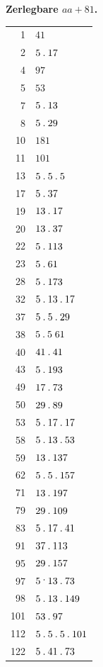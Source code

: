 %
\par{}
\begin{center}\textbf{Zerlegbare $aa+81$.}\end{center}
\begingroup\small\setlength{\tabcolsep}{5pt}
\begin{longtable}{@{}r|l@{}}
1 & $41$\\
2 & $5\mathbin{.} 17$\\
4 & $97$\\
5 & $53$\\
7 & $5\mathbin{.} 13$\\
8 & $5\mathbin{.} 29$\\
10 & $181$\\
11 & $101$\\
13 & $5\mathbin{.} 5\mathbin{.} 5$\\
17 & $5\mathbin{.} 37$\\
19 & $13\mathbin{.} 17$\\
20 & $13\mathbin{.} 37$\\
22 & $5\mathbin{.} 113$\\
23 & $5\mathbin{.} 61$\\
28 & $5\mathbin{.} 173$\\
32 & $5\mathbin{.} 13\mathbin{.} 17$\\
37 & $5\mathbin{.} 5\mathbin{.} 29$\\
38 & $5\mathbin{.} 5\;61$\\
40 & $41\mathbin{.} 41$\\
43 & $5\mathbin{.} 193$\\
49 & $17\mathbin{.} 73$\\
50 & $29\mathbin{.} 89$\\
53 & $5\mathbin{.} 17\mathbin{.} 17$\\
58 & $5\mathbin{.} 13\mathbin{.} 53$\\
59 & $13\mathbin{.} 137$\\
62 & $5\mathbin{.} 5\mathbin{.} 157$\\
71 & $13\mathbin{.} 197$\\
79 & $29\mathbin{.} 109$\\
83 & $5\mathbin{.} 17\mathbin{.} 41$\\
91 & $37\mathbin{.} 113$\\
95 & $29\mathbin{.} 157$\\
97 & $5\mathbin{\raisebox{0.9ex}{.}}13\pdot 73$\\
98 & $5\mathbin{.} 13\mathbin{.} 149$\\
101 & $53\mathbin{.} 97$\\
112 & $5\mathbin{.} 5\mathbin{.} 5\mathbin{.} 101$\\
122 & $5\mathbin{.} 41\mathbin{.} 73$\\

\end{longtable}
